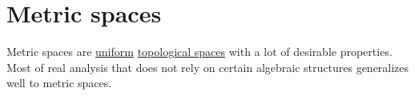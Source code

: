 \section{Metric spaces}\label{sec:metric_spaces}

Metric spaces are \hyperref[def:uniform_space]{uniform} \hyperref[def:topological_space]{topological spaces} with a lot of desirable properties. Most of real analysis that does not rely on certain algebraic structures generalizes well to metric spaces.
